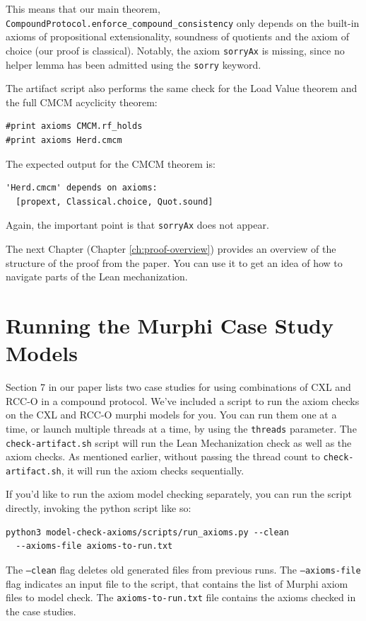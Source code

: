 This means that our main theorem, \texttt{CompoundProtocol.enforce\_compound\_consistency} only depends on the built-in axioms of propositional extensionality, soundness of quotients and the axiom of choice (our proof is classical).
Notably, the axiom \texttt{sorryAx} is missing, since no helper lemma has been admitted using the \texttt{sorry} keyword.

The artifact script also performs the same check for the Load Value theorem and
the full CMCM acyclicity theorem:
\begin{verbatim}
#print axioms CMCM.rf_holds
#print axioms Herd.cmcm
\end{verbatim}
The expected output for the CMCM theorem is:
\begin{verbatim}
'Herd.cmcm' depends on axioms:
  [propext, Classical.choice, Quot.sound]
\end{verbatim}
Again, the important point is that \texttt{sorryAx} does not appear.

The next Chapter (Chapter \ref{ch:proof-overview}) provides an overview of the structure of the proof from the paper.
You can use it to get an idea of how to navigate parts of the Lean mechanization.

\section{Running the Murphi Case Study Models}
\label{sec:readme-murphi-case-studies}

Section 7 in our paper lists two case studies for using combinations
of CXL and RCC-O in a compound protocol.
We've included a script to run the axiom checks on the
CXL and RCC-O murphi models for you. You can run them one at a time, or 
launch multiple threads at a time, by using the \texttt{threads} parameter.
The \texttt{check-artifact.sh} script will run the Lean Mechanization check
as well as the axiom checks.
As mentioned earlier, without passing the thread count to \texttt{check-artifact.sh}, it will
run the axiom checks sequentially.

If you'd like to run the axiom model checking separately, you can run the
script directly, invoking the python script like so:
\begin{verbatim}
python3 model-check-axioms/scripts/run_axioms.py --clean
  --axioms-file axioms-to-run.txt
\end{verbatim}
The \texttt{--clean} flag deletes old generated files from previous runs.
The \texttt{--axioms-file} flag indicates an input file to the script,
that contains the list of Murphi axiom files to model check.
The \texttt{axioms-to-run.txt} file contains the axioms checked in
the case studies.


